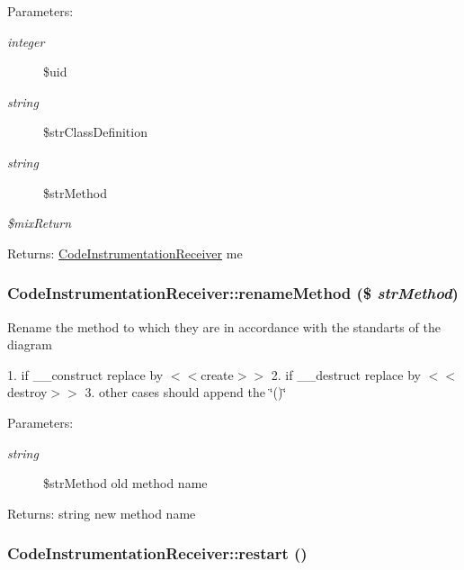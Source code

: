 \begin{Desc}
\item[Parameters:]
\begin{description}
\item[{\em integer}]\$uid \item[{\em string}]\$strClassDefinition \item[{\em string}]\$strMethod \item[{\em \$mixReturn}]\end{description}
\end{Desc}
\begin{Desc}
\item[Returns:]\hyperlink{class_code_instrumentation_receiver}{CodeInstrumentationReceiver} me \end{Desc}
\hypertarget{class_code_instrumentation_receiver_f103bccb49a8e11c8da7d4a12bee14cc}{
\subsubsection[{renameMethod}]{\setlength{\rightskip}{0pt plus 5cm}CodeInstrumentationReceiver::renameMethod (\$ {\em strMethod})}}
\label{class_code_instrumentation_receiver_f103bccb49a8e11c8da7d4a12bee14cc}


Rename the method to which they are in accordance with the standarts of the diagram

1. if \_\-\_\-construct replace by $<$$<$create$>$$>$ 2. if \_\-\_\-destruct replace by $<$$<$destroy$>$$>$ 3. other cases should append the \char`\"{}()\char`\"{}

\begin{Desc}
\item[Parameters:]
\begin{description}
\item[{\em string}]\$strMethod old method name \end{description}
\end{Desc}
\begin{Desc}
\item[Returns:]string new method name \end{Desc}
\hypertarget{class_code_instrumentation_receiver_7f475c5ce6f32c9ab0aac748646deaa8}{
\subsubsection[{restart}]{\setlength{\rightskip}{0pt plus 5cm}CodeInstrumentationReceiver::restart ()}}
\label{class_code_instrumentation_receiver_7f475c5ce6f32c9ab0aac748646deaa8}


